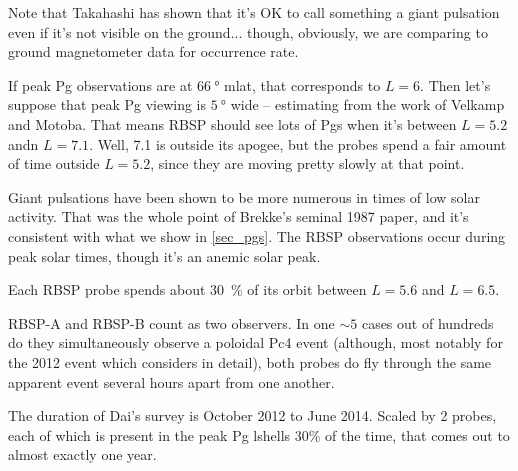 Note that Takahashi\cite{takahashi_2013} has shown that it's OK to call something a giant pulsation even if it's not visible on the ground... though, obviously, we are comparing to ground magnetometer data for occurrence rate. 

If peak Pg observations are at $\SI{66}{\degree}$ mlat, that corresponds to $L = 6$. Then let's suppose that peak Pg viewing is $\SI{5}{\degree}$ wide -- estimating from the work of Velkamp and Motoba. That means RBSP should see lots of Pgs when it's between $L = 5.2$ andn $L = 7.1$. Well, \SI{7.1}{\RE} is outside its apogee, but the probes spend a fair amount of time outside $L = 5.2$, since they are moving pretty slowly at that point. 

Giant pulsations have been shown to be more numerous in times of low solar activity. That was the whole point of Brekke's seminal 1987 paper, and it's consistent with what we show in \cref{sec_pgs}. The RBSP observations occur during peak solar times, though it's an anemic solar peak\cite{pesnell_2016}. 


Each RBSP probe spends about \SI{30}{\percent} of its orbit between $L = 5.6$ and $L = 6.5$. 

RBSP-A and RBSP-B count as two observers. In one $\sim 5$ cases out of hundreds do they simultaneously observe a poloidal Pc4 event (although, most notably for the 2012 event which \cite{dai_2013} considers in detail), both probes do fly through the same apparent event several hours apart from one another. 

The duration of Dai's survey is October 2012 to June 2014. Scaled by 2 probes, each of which is present in the peak Pg lshells 30\% of the time, that comes out to almost exactly one year. 









